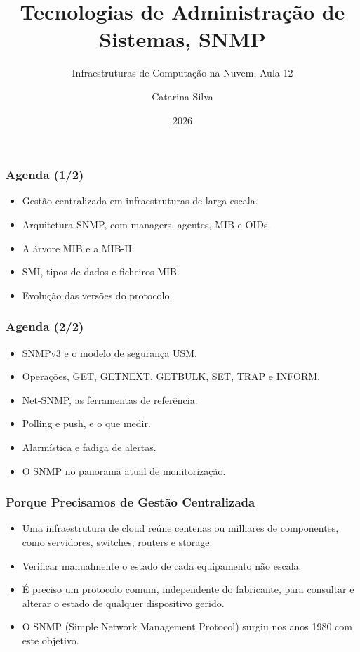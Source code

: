 \documentclass[aspectratio=169]{beamer}
\title{Tecnologias de Administração de Sistemas, SNMP}
\subtitle{Infraestruturas de Computação na Nuvem, Aula 12}
\author{Catarina Silva}
\institute{ESTGA, Universidade de Aveiro}
\date{2026}
\begin{document}
\begin{frame}[plain]
  \titlepage
\end{frame}

\begin{frame}
\frametitle{Agenda \textcolor{NudeTaupe}{\small(1/2)}}
\begin{itemize}
    \setlength\itemsep{0.4cm}
    \item Gestão centralizada em infraestruturas de larga escala.
    \item Arquitetura SNMP, com managers, agentes, MIB e OIDs.
    \item A árvore MIB e a MIB-II.
    \item SMI, tipos de dados e ficheiros MIB.
    \item Evolução das versões do protocolo.
\end{itemize}
\end{frame}

\begin{frame}
\frametitle{Agenda \textcolor{NudeTaupe}{\small(2/2)}}
\begin{itemize}
    \setlength\itemsep{0.4cm}
    \item SNMPv3 e o modelo de segurança USM.
    \item Operações, GET, GETNEXT, GETBULK, SET, TRAP e INFORM.
    \item Net-SNMP, as ferramentas de referência.
    \item Polling e push, e o que medir.
    \item Alarmística e fadiga de alertas.
    \item O SNMP no panorama atual de monitorização.
\end{itemize}
\end{frame}

\begin{frame}
\frametitle{Porque Precisamos de Gestão Centralizada}
\begin{itemize}
    \setlength\itemsep{0.4cm}
    \item Uma infraestrutura de cloud reúne centenas ou milhares de componentes, como servidores, switches, routers e storage.
    \item Verificar manualmente o estado de cada equipamento não escala.
    \item É preciso um protocolo comum, independente do fabricante, para consultar e alterar o estado de qualquer dispositivo gerido.
    \item O SNMP (Simple Network Management Protocol) surgiu nos anos 1980 com este objetivo.
\end{itemize}
\end{frame}
\end{document}
